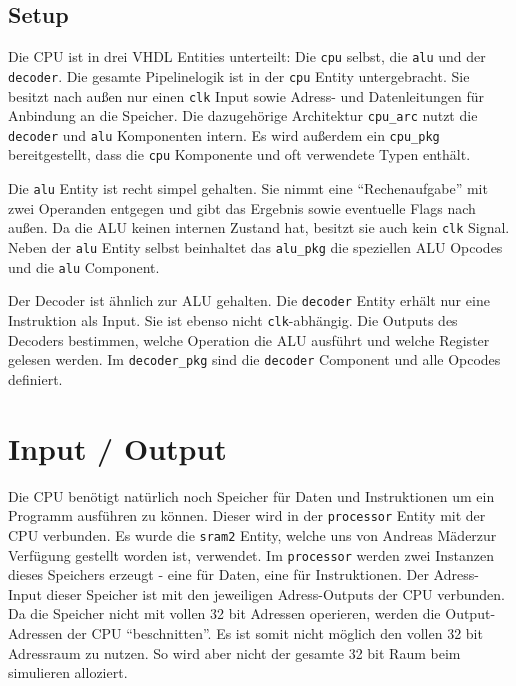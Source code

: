 \documentclass[paper=a4,fontsize=12pt,twocolumn]{scrreprt}
\begin{document}
\subsection{Setup}

Die CPU ist in drei VHDL Entities unterteilt: Die \texttt{cpu} selbst, die \texttt{alu} und der \texttt{decoder}.
Die gesamte Pipelinelogik ist in der \texttt{cpu} Entity untergebracht.
Sie besitzt nach außen nur einen \texttt{clk} Input sowie Adress- und Datenleitungen für Anbindung an die Speicher\footnotemark.
Die dazugehörige Architektur \texttt{cpu\_arc} nutzt die \texttt{decoder} und \texttt{alu} Komponenten intern.
Es wird außerdem ein \texttt{cpu\_pkg} bereitgestellt, dass die \texttt{cpu} Komponente und oft verwendete Typen enthält.

Die \texttt{alu} Entity ist recht simpel gehalten.
Sie nimmt eine \enquote{Rechenaufgabe} mit zwei Operanden entgegen und gibt das Ergebnis sowie eventuelle Flags nach außen.
Da die ALU keinen internen Zustand hat, besitzt sie auch kein \texttt{clk} Signal.
Neben der \texttt{alu} Entity selbst beinhaltet das \texttt{alu\_pkg} die speziellen ALU Opcodes und die \texttt{alu} Component.

Der Decoder ist ähnlich zur ALU gehalten.
Die \texttt{decoder} Entity erhält nur eine Instruktion als Input.
Sie ist ebenso nicht \texttt{clk}-abhängig.
Die Outputs des Decoders bestimmen, welche Operation die ALU ausführt und welche Register gelesen werden.
Im \texttt{decoder\_pkg} sind die \texttt{decoder} Component und alle Opcodes definiert.


\section{Input / Output}

Die CPU benötigt natürlich noch Speicher für Daten und Instruktionen um ein Programm ausführen zu können.
Dieser wird in der \texttt{processor} Entity mit der CPU verbunden.
Es wurde die \texttt{sram2} Entity, welche uns von Andreas Mäder\footnotemark zur Verfügung gestellt worden ist, verwendet.
Im \texttt{processor} werden zwei Instanzen dieses Speichers erzeugt - eine für Daten, eine für Instruktionen.
Der Adress-Input dieser Speicher ist mit den jeweiligen Adress-Outputs der CPU verbunden.
Da die Speicher nicht mit vollen 32 bit Adressen operieren, werden die Output-Adressen der CPU \enquote{beschnitten}.
Es ist somit nicht möglich den vollen 32 bit Adressraum zu nutzen.
So wird aber nicht der gesamte 32 bit Raum beim simulieren alloziert.
\end{document}
